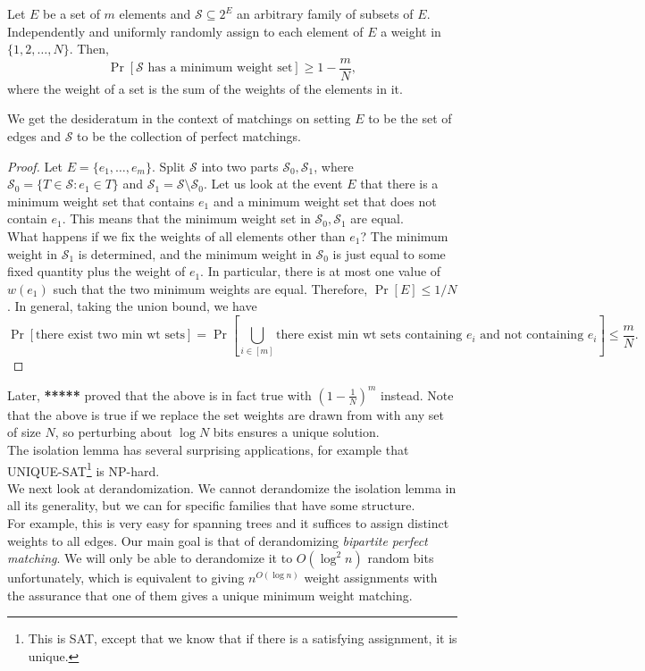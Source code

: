 			\begin{flem}
				Let $E$ be a set of $m$ elements and $\mathcal{S} \subseteq 2^E$ an arbitrary family of subsets of $E$. Independently and uniformly randomly assign to each element of $E$ a weight in $\{1,2,\ldots,N\}$. Then,
				\[ \Pr\left[ \mathcal{S} \text{ has a minimum weight set} \right] \ge 1 - \frac{m}{N}, \]
				where the weight of a set is the sum of the weights of the elements in it.
			\end{flem}
			We get the desideratum in the context of matchings on setting $E$ to be the set of edges and $\mathcal{S}$ to be the collection of perfect matchings. 
			\begin{proof}
				Let $E = \{e_1,\ldots,e_m\}$. Split $\mathcal{S}$ into two parts $\mathcal{S}_0,\mathcal{S}_1$, where $\mathcal{S}_0 = \{ T \in \mathcal{S} : e_1 \in T \}$ and $\mathcal{S}_1 = \mathcal{S} \setminus \mathcal{S}_0$. Let us look at the event $E$ that there is a minimum weight set that contains $e_1$ and a minimum weight set that does not contain $e_1$. This means that the minimum weight set in $\mathcal{S}_0,\mathcal{S}_1$ are equal.\\
				What happens if we fix the weights of all elements other than $e_1$? The minimum weight in $\mathcal{S}_1$ is determined, and the minimum weight in $\mathcal{S_0}$ is just equal to some fixed quantity plus the weight of $e_1$. In particular, there is at most one value of $w(e_1)$ such that the two minimum weights are equal. Therefore, $\Pr[E] \le 1/N$. In general, taking the union bound, we have
				\[ \Pr[\text{there exist two min wt sets}] = \Pr\left[ \bigcup_{i \in [m]} \text{there exist min wt sets containing $e_i$ and not containing $e_i$} \right] \le \frac{m}{N}. \]
			\end{proof}
			Later, \textbf{*****} proved that the above is in fact true with $\left( 1 - \frac{1}{N} \right)^m$ instead. Note that the above is true if we replace the set weights are drawn from with any set of size $N$, so perturbing about $\log N$ bits ensures a unique solution.\\

			The isolation lemma has several surprising applications, for example that \textsf{UNIQUE-SAT}\footnote{This is \textsf{SAT}, except that we know that if there is a satisfying assignment, it is unique.} is \textsf{NP}-hard.\\

			We next look at derandomization. We cannot derandomize the isolation lemma in all its generality, but we can for specific families that have some structure.\\
			For example, this is very easy for spanning trees and it suffices to assign distinct weights to all edges. Our main goal is that of derandomizing \emph{bipartite perfect matching}. We will only be able to derandomize it to $O(\log^2n)$ random bits unfortunately, which is equivalent to giving $n^{O(\log n)}$ weight assignments with the assurance that one of them gives a unique minimum weight matching.\\


